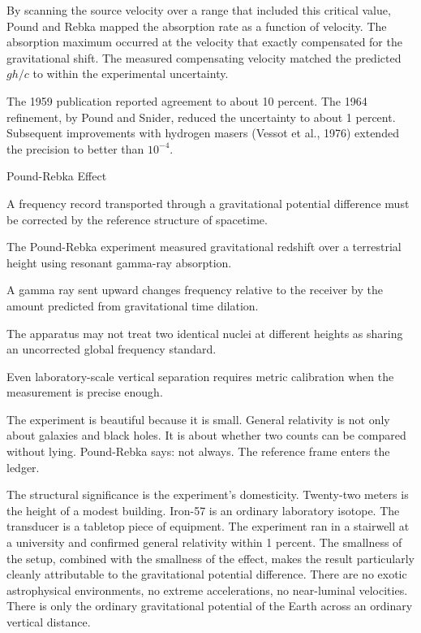 By scanning the source velocity over a range that included this critical
value, Pound and Rebka mapped the absorption rate as a function of velocity.
The absorption maximum occurred at the velocity that exactly compensated for
the gravitational shift. The measured compensating velocity matched the
predicted $gh/c$ to within the experimental uncertainty.

The 1959 publication reported agreement to about 10 percent. The 1964
refinement, by Pound and Snider, reduced the uncertainty to about 1 percent.
Subsequent improvements with hydrogen masers (Vessot et al., 1976) extended
the precision to better than $10^{-4}$.

\begin{phenom}{Pound-Rebka Effect}
\label{ph:pound-rebka-effect}

\PhStatement A frequency record transported through a gravitational potential
difference must be corrected by the reference structure of spacetime.

\PhOrigin The Pound-Rebka experiment measured gravitational redshift over a
terrestrial height using resonant gamma-ray absorption.

\PhObservation A gamma ray sent upward changes frequency relative to the
receiver by the amount predicted from gravitational time dilation.

\PhConstraint The apparatus may not treat two identical nuclei at different
heights as sharing an uncorrected global frequency standard.

\PhConsequence Even laboratory-scale vertical separation requires metric
calibration when the measurement is precise enough.

\end{phenom}

The experiment is beautiful because it is small. General relativity is not
only about galaxies and black holes. It is about whether two counts can be
compared without lying. Pound-Rebka says: not always. The reference frame
enters the ledger.

The structural significance is the experiment's domesticity. Twenty-two
meters is the height of a modest building. Iron-57 is an ordinary
laboratory isotope. The transducer is a tabletop piece of equipment. The
experiment ran in a stairwell at a university and confirmed general
relativity within 1 percent. The smallness of the setup, combined with
the smallness of the effect, makes the result particularly cleanly
attributable to the gravitational potential difference. There are no
exotic astrophysical environments, no extreme accelerations, no
near-luminal velocities. There is only the ordinary gravitational
potential of the Earth across an ordinary vertical distance.

